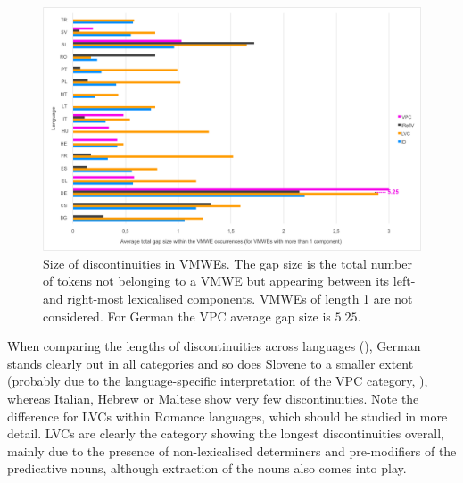 \documentclass[output=paper,modfonts]{langscibook}
\begin{document}

\begin{figure}
\centering
\includegraphics[width=1.0\textwidth]{figures/parseme-st-2017-BOOK-CORPUS-chart-discont.png}
\caption{Size of discontinuities in VMWEs. The gap size is the total number of tokens not belonging to a VMWE but appearing between its left- and  right-most lexicalised components.
VMWEs of length 1 are not considered. For German the VPC average gap size is $5.25$.}
\label{fig:gaps-per-category}
\end{figure}
When comparing the lengths of discontinuities across languages (), German stands clearly out %
in all categories %
and so does Slovene to a smaller extent (probably due to the language-specific interpretation of the VPC category, ), whereas Italian, Hebrew or Maltese show very few discontinuities. Note the difference for LVCs within Romance languages, which should be studied in more detail. %
LVCs are clearly the category showing the longest discontinuities overall, mainly due to the presence of non-lexicalised determiners and pre-modifiers of the predicative nouns, although extraction of the nouns also comes into play.
\end{document}
